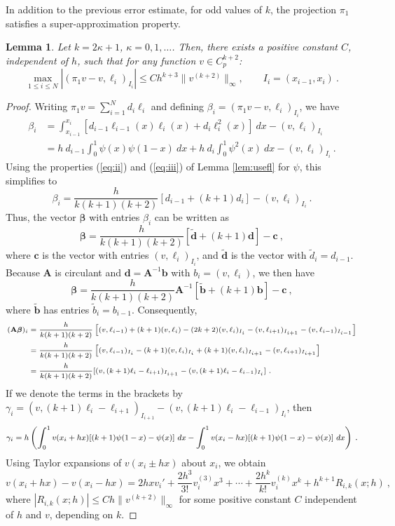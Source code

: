 \documentclass{amsart}
\newcommand{\bd}{\mathbf{d}}
\newcommand{\bb}{\mathbf{b}}
\newcommand{\bc}{\mathbf{c}}
\newcommand{\bA}{\mathbf{A}}
\newcommand{\bbeta}{\boldsymbol{\beta}}
\newtheorem{lemma}{Lemma}[section]
\begin{document}
In addition to the previous error estimate, for odd values of $k$, the projection $\pi_1$ satisfies a super-approximation property.
%
\begin{lemma}\label{lem:superapprox}
Let $k=2\kappa+1$, $\kappa=0,1,\dots$. Then, there exists a positive constant $C$, independent of $h$, such that for any function $v\in C_p^{k+2}$: 
\begin{equation}\label{eq:superapprox}
\max_{1\leq i\leq N} \left|(\pi_1 v-v,\ell_i)_{I_i} \right|\leq C h^{k+3}\|v^{(k+2)}\|_\infty,\qquad I_i=(x_{i-1},x_i)\ .
\end{equation}
\end{lemma}
%
\begin{proof}
Writing $\pi_1v=\sum_{i=1}^N d_i\ell_i$ and defining $\beta_i=(\pi_1v-v,\ell_i)_{I_i}$, we have 
$$\begin{aligned}
\beta_i&=\int_{x_{i-1}}^{x_i}\left[d_{i-1}\ell_{i-1}(x)\ell_i(x)+d_i\ell_i^2(x) \right]~dx-(v,\ell_i)_{I_i}\\
&=h\ d_{i-1}\int_0^1 \psi(x)\psi(1-x)~dx+h\ d_i \int_0^1 \psi^2(x)~dx-(v,\ell_i)_{I_i}\ .
\end{aligned}$$
Using the properties (\ref{eq:ii}) and (\ref{eq:iii}) of Lemma \ref{lem:usefl} for $\psi$, this simplifies to
$$\beta_i=\frac{h}{k(k+1)(k+2)}\left[d_{i-1}+(k+1)d_i \right]- (v,\ell_i)_{I_i}\ .$$
Thus, the vector $\bbeta$ with entries $\beta_i$ can be written as
$$\bbeta=\frac{h}{k(k+1)(k+2)}\left[\widetilde{\bd}+(k+1)\bd \right] - \bc\ ,$$
where $\bc$ is the vector with entries $(v,\ell_i)_{I_i}$, and $\widetilde{\bd}$ is the vector with $\widetilde{d}_i=d_{i-1}$.
%
Because $\bA$ is circulant and $\bd=\bA^{-1}\bb$ with $b_i=(v,\ell_i)$, we then have
$$\bbeta=\frac{h}{k(k+1)(k+2)}\bA^{-1}\left[\widetilde{\bb}+(k+1)\bb \right] - \bc\ ,$$
where $\widetilde{\bb}$ has entries $\widetilde{b}_i=b_{i-1}$.
%
Consequently, 
$$
\text{\scriptsize
$
\begin{aligned}
(\bA\bbeta)_i&=\frac{h}{k(k+1)(k+2)}\left[(v,\ell_{i-1})+(k+1)(v,\ell_i)-(2k+2)(v,\ell_i)_{I_i}-(v,\ell_{i+1})_{I_{i+1}}-(v,\ell_{i-1})_{I_{i-1}} \right]\\
&=\frac{h}{k(k+1)(k+2)}\left[(v,\ell_{i-1})_{I_i}-(k+1)(v,\ell_i)_{I_i}+(k+1)(v,\ell_i)_{I_{i+1}}-(v,\ell_{i+1})_{I_{i+1}} \right]\\
&=\frac{h}{k(k+1)(k+2)}[(v,(k+1)\ell_i-\ell_{i+1})_{I_{i+1}}-(v,(k+1)\ell_i-\ell_{i-1})_{I_i}]\ .
\end{aligned}
$}
$$
If we denote the terms in the brackets by 
$\gamma_i=(v,(k+1)\ell_i-\ell_{i+1})_{I_{i+1}}-(v,(k+1)\ell_i-\ell_{i-1})_{I_i}$, then
$$\text{\footnotesize $
\gamma_i=h\left(\int_0^1 v(x_i+hx)[(k+1)\psi(1-x)-\psi(x)]~dx-\int_0^1v(x_i-hx)[(k+1)\psi(1-x)-\psi(x)]~dx \right)$}\ .
$$
Using Taylor expansions of $v(x_i\pm hx)$ about $x_i$, we obtain
\begin{equation}\label{eq:basicdiff}
v(x_i+hx)-v(x_i-hx)=2hx v_i'+\frac{2h^3}{3!}v_i^{(3)} x^3+\cdots+\frac{2h^k}{k!} v_i^{(k)}x^k+h^{k+1}R_{i,k}(x;h)\ ,
\end{equation}
where $|R_{i,k}(x;h)|\leq C h \|v^{(k+2)}\|_\infty$ for some positive constant $C$ independent of $h$ and $v$, depending on $k$.


\end{proof}
\end{document}
